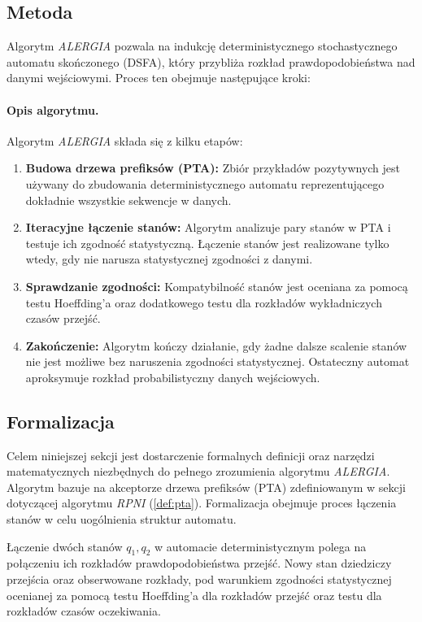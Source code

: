 \subsection{Metoda}  
Algorytm \textit{ALERGIA} pozwala na indukcję deterministycznego stochastycznego automatu skończonego (DSFA), który przybliża rozkład prawdopodobieństwa nad danymi wejściowymi. Proces ten obejmuje następujące kroki:  

\paragraph*{Opis algorytmu.}  
Algorytm \textit{ALERGIA} składa się z kilku etapów:  
\begin{enumerate}  
    \item \textbf{Budowa drzewa prefiksów (PTA):}  
        Zbiór przykładów pozytywnych jest używany do zbudowania deterministycznego automatu reprezentującego dokładnie wszystkie sekwencje w danych.  
    \item \textbf{Iteracyjne łączenie stanów:}  
        Algorytm analizuje pary stanów w PTA i testuje ich zgodność statystyczną. Łączenie stanów jest realizowane tylko wtedy, gdy nie narusza statystycznej zgodności z danymi.  
    \item \textbf{Sprawdzanie zgodności:}  
        Kompatybilność stanów jest oceniana za pomocą testu Hoeffding'a oraz dodatkowego testu dla rozkładów wykładniczych czasów przejść.  
    \item \textbf{Zakończenie:}  
        Algorytm kończy działanie, gdy żadne dalsze scalenie stanów nie jest możliwe bez naruszenia zgodności statystycznej. Ostateczny automat aproksymuje rozkład probabilistyczny danych wejściowych.  
\end{enumerate}

\subsection{Formalizacja}  
Celem niniejszej sekcji jest dostarczenie formalnych definicji oraz narzędzi matematycznych niezbędnych do pełnego zrozumienia algorytmu \textit{ALERGIA}. Algorytm bazuje na akceptorze drzewa prefiksów (PTA) zdefiniowanym w sekcji dotyczącej algorytmu \textit{RPNI} (\ref{def:pta}). Formalizacja obejmuje proces łączenia stanów w celu uogólnienia struktur automatu.  

\begin{definition}  
    \label{def:alergia_state_merging}  
    Łączenie dwóch stanów \( q_1, q_2 \) w automacie deterministycznym polega na połączeniu ich rozkładów prawdopodobieństwa przejść. Nowy stan dziedziczy przejścia oraz obserwowane rozkłady, pod warunkiem zgodności statystycznej ocenianej za pomocą testu Hoeffding'a dla rozkładów przejść oraz testu dla rozkładów czasów oczekiwania.  
\end{definition}  

